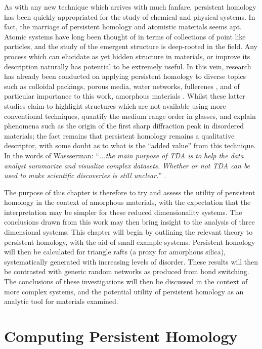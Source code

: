 As with any new technique which arrives with much fanfare, persistent homology has been quickly appropriated for the study of chemical and physical systems.
In fact, the marriage of persistent homology and atomistic materials seems apt.
Atomic systems have long been thought of in terms of collections of point like particles, and the study of the emergent structure is deep\--rooted in the field.
Any process which can elucidate as yet hidden structure in materials, or improve its description naturally has potential to be extremely useful.
In this vein, research has already been conducted on applying persistent homology to diverse topics such as colloidal packings, porous media, water networks, fullerenes \cite{Carter2018,Robins2017,Jiang2018,Steinberg2019,Xia2015}, and of particular importance to this work, amorphous materials \cite{Hiraoka2016,Onodera2019,Nakamura2015,Gutierrez2019}.
Whilst these latter studies claim to highlight structures which are not available using more conventional techniques, quantify the medium range order in glasses, and explain phenomena such as the origin of the first sharp diffraction peak in disordered materials; the fact remains that persistent homology remains a qualitative descriptor, with some doubt as to what is the ``added value'' from this technique. 
In the words of Wassserman: ``\textit{...the main purpose of TDA is to help the data analyst summarize and visualize
complex datasets. Whether or not TDA can be used to make scientific discoveries is still unclear.}'' \cite{Wasserman2018}.

The purpose of this chapter is therefore to try and assess the utility of persistent homology in the context of \td{} amorphous materials, with the expectation that the interpretation may be simpler for these reduced dimensionality systems.
The conclusions drawn from this work may then bring insight to the analysis of three dimensional systems.
This chapter will begin by outlining the relevant theory to persistent homology, with the aid of small example systems.
Persistent homology will then be calculated for triangle rafts (a proxy for amorphous silica), systematically generated with increasing levels of disorder.
These results will then be contrasted with generic random networks as produced from bond switching.
The conclusions of these investigations will then be discussed in the context of more complex systems, and the potential utility of persistent homology as an analytic tool for materials examined.

\section{Computing Persistent Homology}

